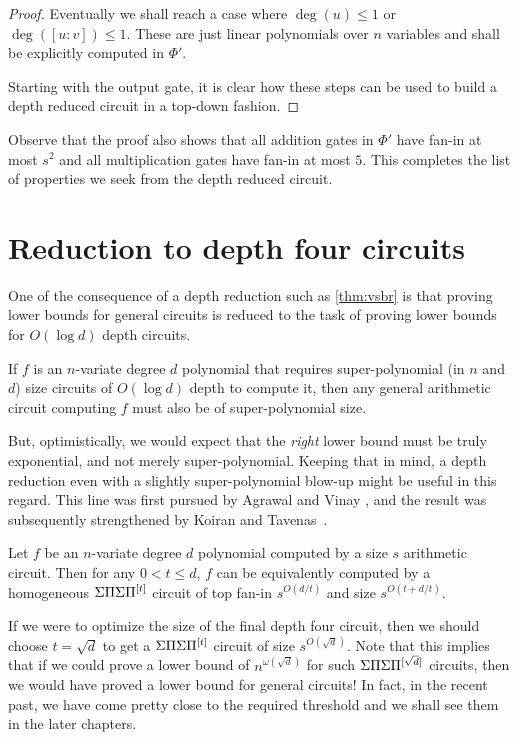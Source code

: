 \begin{proof}
  Eventually we shall reach a case where $\deg(u)\leq 1$ or $\deg([u:v])
  \leq 1$. 
These are just linear polynomials over $n$ variables and
  shall be explicitly computed in $\Phi'$.

  Starting with the output gate, it is clear how these steps can be
  used to build a depth reduced circuit in a top-down fashion.
\end{proof}

Observe that the proof also shows that all addition gates in $\Phi'$
have fan-in at most $s^2$ and all multiplication gates have fan-in at
most $5$. 
This completes the list of properties we seek from the depth
reduced circuit.


\section{Reduction to depth four circuits}

One of the consequence of a depth reduction such as \autoref{thm:vsbr} is that proving lower bounds for general circuits is reduced to the task of proving lower bounds for $O(\log d)$ depth circuits. 

\begin{corollary}\label{cor:vsbr-contra}
If $f$ is an $n$-variate degree $d$ polynomial that requires super-polynomial (in $n$ and $d$) size circuits of $O(\log d)$ depth to compute it, then any general arithmetic circuit computing $f$ must also be of super-polynomial size. 
\end{corollary}

But, optimistically, we would expect that the \emph{right} lower bound must be truly exponential, and not merely super-polynomial. 
Keeping that in mind, a depth reduction even with a slightly super-polynomial blow-up might be useful in this regard. 
This line was first pursued by Agrawal and Vinay \cite{av08}, and the result was subsequently strengthened by Koiran \cite{koiran} and Tavenas~\cite{Tav13}. 

\begin{theorem} \label{thm:av}
Let $f$ be an $n$-variate degree $d$ polynomial computed by a size $s$ arithmetic circuit. 
Then for any $0< t \leq d$, $f$ can be equivalently computed by a homogeneous $\Sigma\Pi\Sigma\Pi^{[t]}$ circuit of top fan-in $s^{O(d/t)}$ and size $s^{O(t + d/t)}$. 
\end{theorem}

If we were to optimize the size of the final depth four circuit, then we should choose $t = \sqrt{d}$ to get a $\Sigma\Pi\Sigma\Pi^{[t]}$ circuit of size $s^{O(\sqrt{d})}$. 
Note that this implies that if we could prove a lower bound of $n^{\omega(\sqrt{d})}$ for such $\Sigma\Pi\Sigma\Pi^{[\sqrt{d}]}$ circuits, then we would have proved a lower bound for general circuits! 
In fact, in the recent past, we have come pretty close to the required threshold and we shall see them in the later chapters. \\

